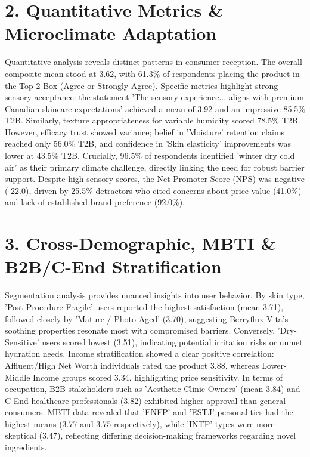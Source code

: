 \documentclass[10pt,twocolumn,a4paper]{article}
\begin{document}
\section{2. Quantitative Metrics \& Microclimate Adaptation}
Quantitative analysis reveals distinct patterns in consumer reception. The overall composite mean stood at 3.62, with 61.3\% of respondents placing the product in the Top-2-Box (Agree or Strongly Agree). Specific metrics highlight strong sensory acceptance: the statement 'The sensory experience... aligns with premium Canadian skincare expectations' achieved a mean of 3.92 and an impressive 85.5\% T2B. Similarly, texture appropriateness for variable humidity scored 78.5\% T2B. However, efficacy trust showed variance; belief in 'Moisture' retention claims reached only 56.0\% T2B, and confidence in 'Skin elasticity' improvements was lower at 43.5\% T2B. Crucially, 96.5\% of respondents identified 'winter dry cold air' as their primary climate challenge, directly linking the need for robust barrier support. Despite high sensory scores, the Net Promoter Score (NPS) was negative (-22.0), driven by 25.5\% detractors who cited concerns about price value (41.0\%) and lack of established brand preference (92.0\%).
\section{3. Cross-Demographic, MBTI \& B2B/C-End Stratification}
Segmentation analysis provides nuanced insights into user behavior. By skin type, 'Post-Procedure Fragile' users reported the highest satisfaction (mean 3.71), followed closely by 'Mature / Photo-Aged' (3.70), suggesting Berryflux Vita’s soothing properties resonate most with compromised barriers. Conversely, 'Dry-Sensitive' users scored lowest (3.51), indicating potential irritation risks or unmet hydration needs. Income stratification showed a clear positive correlation: Affluent/High Net Worth individuals rated the product 3.88, whereas Lower-Middle Income groups scored 3.34, highlighting price sensitivity. In terms of occupation, B2B stakeholders such as 'Aesthetic Clinic Owners' (mean 3.84) and C-End healthcare professionals (3.82) exhibited higher approval than general consumers. MBTI data revealed that 'ENFP' and 'ESTJ' personalities had the highest means (3.77 and 3.75 respectively), while 'INTP' types were more skeptical (3.47), reflecting differing decision-making frameworks regarding novel ingredients.
\end{document}
